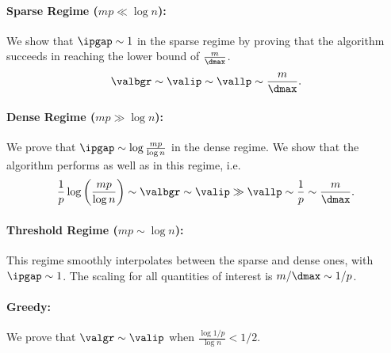 \paragraph*{\textbf{Sparse Regime} ($mp \ll \log n$):}
We show that \(\ipgap \sim 1\) in the sparse regime by proving that the \bgreedy algorithm succeeds in reaching the \lp lower bound of $\frac{m}{\dmax}$.
\[ \valbgr \sim \valip \sim \vallp \sim \frac{m}{\dmax}. \]


\paragraph*{\textbf{Dense Regime} ($mp \gg \log n$):}
We prove that \(\ipgap \sim \log \frac{mp}{\log n}\) in the dense regime. We show that the \bgreedy algorithm performs as well as \ip in this regime, i.e.
\[ \frac{1}{p} \log\left(\frac{mp}{\log n}\right) \sim \valbgr \sim \valip \gg \vallp \sim \frac{1}{p} \sim \frac{m}{\dmax}. \] 


\paragraph*{\textbf{Threshold Regime} ($mp \sim \log n$):} This regime smoothly interpolates between the sparse and dense ones, with \(\ipgap \sim 1\). 
The scaling for all quantities of interest is $m / \dmax \sim 1/p$.


\paragraph*{\textbf{Greedy}:} We prove that $\valgr \sim \valip$ when $\frac{\log 1 / p}{\log n} < 1/2$. 
